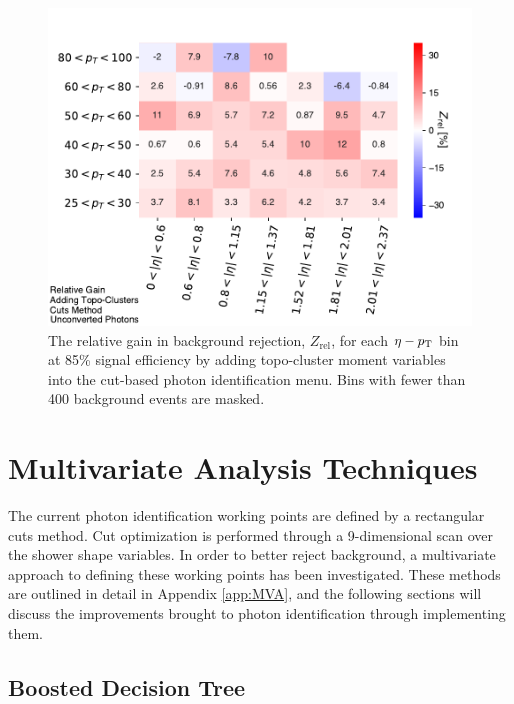 \begin{figure}[!thp]
    \centering
    \includegraphics[width=.85\textwidth]{chapters/chapter4_photonID/images/gain_topoAdded_unconverted.pdf}
    \caption[The relative gain in background rejection, $Z_{\text{rel}}$, for each $\eta-\pt$ bin at 85\% signal efficiency by adding topo-cluster moment variables into the cut-based photon identification menu]{The relative gain in background rejection, $Z_{\text{rel}}$, for each $\eta-\pt$ bin at 85\% signal efficiency by adding topo-cluster moment variables into the cut-based photon identification menu. Bins with fewer than 400 background events are masked.}
    \label{fig:gain-topo-clusters-added-unconverted}
\end{figure}


\section{Multivariate Analysis Techniques}

The current photon identification working points are defined by a rectangular cuts method. Cut optimization is performed through a 9-dimensional scan over the shower shape variables. In order to better reject background, a multivariate approach to defining these working points has been investigated. These methods are outlined in detail in Appendix \ref{app:MVA}, and the following sections will discuss the improvements brought to photon identification through implementing them.

\subsection{Boosted Decision Tree}

